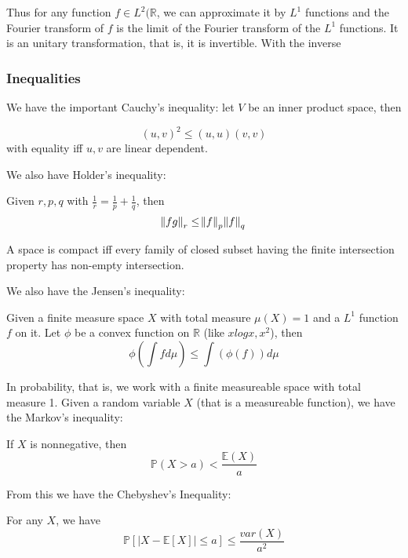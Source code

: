 \documentclass[main.tex]{subfiles}
\begin{document}
Thus for any function $f \in L^2(\mathbb{R}$, we can approximate it by $L^1$ functions and the Fourier transform of $f$ is the limit of the Fourier transform of the $L^1$ functions. It is an unitary transformation, that is, it is invertible. With the inverse
\subsubsection{Inequalities}

We have the important Cauchy's inequality:
let $V$ be an inner product space, then 
\begin{theorem}
$$(u,v)^2 \leq (u,u) (v,v)$$
with equality iff $u,v$ are linear dependent.
\end{theorem}

We also have Holder's inequality:

\begin{theorem}
Given $r, p, q$ with $\frac{1}{r} = \frac{1}{p} + \frac{1}{q}$, then 
$$
\norm{fg}_r \leq \norm{f}_{p}  \norm{f}_q
$$

A space is compact iff every family of closed subset having the finite intersection property  has non-empty intersection.

\end{theorem}

We also have the Jensen's inequality:

\begin{theorem}
Given a finite measure space $X$ with total measure $\mu(X) = 1$ and a $L^1$ function $f$ on it. Let $\phi$ be a convex function on $\mathbb{R}$ (like $x log x, x^2$), then 
$$
\phi(\int f d\mu) \leq \int (\phi (f)) d\mu
$$
\end{theorem}

In probability, that is, we work with a finite measureable space with total measure 1. Given a random variable $X$ (that is a measureable function), we have the Markov's inequality:

\begin{theorem}
If $X$ is nonnegative, then 
$$
\mathbb{P}(X > a) < \frac{\mathbb{E}(X)}{a}
$$
\end{theorem}

From this we have the Chebyshev's Inequality:

\begin{theorem}
For any $X$, we have 
$$
\mathbb{P}[|X - \mathbb{E}[X]| \leq a] \leq \frac{var(X)}{a^2}
$$
\end{theorem}
\end{document}
